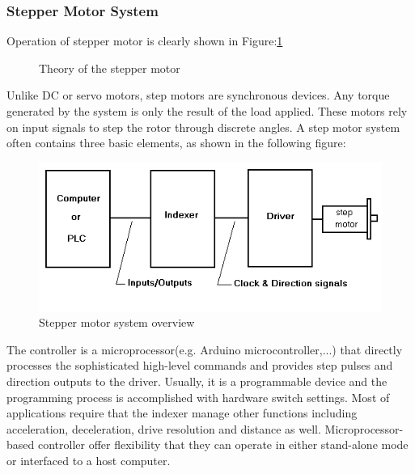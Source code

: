 \subsubsection{Stepper Motor System}
Operation of stepper motor is clearly shown in Figure:\ref{fig:theory_of_the_stepper_motor}
\begin{figure}[H]
    \centering
    \qquad
    \caption{Theory of the stepper motor}%
    \label{fig:theory_of_the_stepper_motor}%
\end{figure}
Unlike DC or servo motors, step motors are synchronous devices. Any torque generated by the system is only the result of the load applied. These motors rely on input signals to step the rotor through discrete angles. A step motor system often contains three basic elements, as shown in the following figure:
\begin{figure}[H]
	\centering
	\includegraphics[width=\maxwidth{15cm}, keepaspectratio]{Chapters/Fig/stepper_motor_system.png}
	\caption{Stepper motor system overview}
	\label{fig:stepper_motor_system}
\end{figure}
The controller is a microprocessor(e.g. Arduino microcontroller,...) that directly processes the sophisticated high-level commands and provides step pulses and direction outputs to the driver. Usually, it is a programmable device and the programming process is accomplished with hardware switch settings. Most of applications require that the indexer manage other functions including acceleration, deceleration, drive resolution and distance as well. Microprocessor-based controller offer flexibility that they can operate in either stand-alone mode or interfaced to a host computer.

